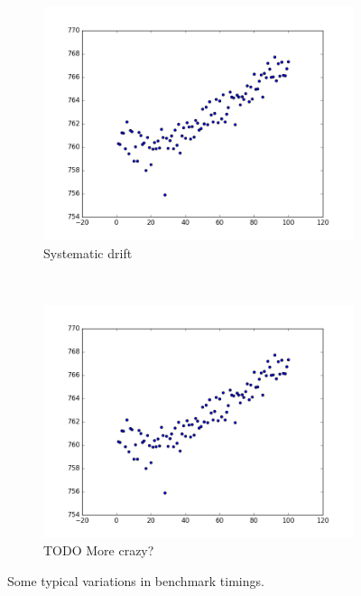 \documentclass[conference]{IEEEtran}
\begin{document}
\begin{figure}
\begin{subfigure}{0.22\textwidth}
    \centering
    \includegraphics[width=\textwidth]{experiments/images/mean_repeated_sqralloc}
    \caption{Systematic drift}
\end{subfigure}
~
\begin{subfigure}{0.22\textwidth}
    \centering
    \includegraphics[width=\textwidth]{experiments/images/mean_repeated_sqralloc}
    \caption{TODO More crazy?}
\end{subfigure}

\caption{Some typical variations in benchmark timings.}
\label{fig:examplebenchmarks}
\end{figure}
\end{document}
